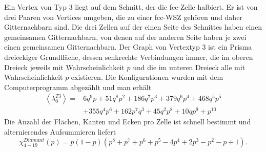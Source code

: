 Ein Vertex von Typ 3 liegt auf dem Schnitt, der die fcc-Zelle halbiert. Er ist von drei Paaren von Vertices umgeben, die zu einer fcc-WSZ geh\"oren und daher Gitternachbarn sind. Die drei Zellen auf der einen Seite des Schnittes haben einen gemeinsamen Gitternachbarn, von denen auf der anderen Seite haben je zwei einen gemeinsamen Gitternachbarn. Der Graph von Vertextyp 3 ist ein Prisma dreieckiger Grundfl\"ache, dessen senkrechte Verbindungen immer, die im oberen Dreieck jeweils mit Wahrscheinlichkeit $p$ und die im unteren Dreieck alle mit Wahrscheinlichkeit $p$ existieren. Die Konfigurationen wurden mit dem Computerprogramm abgez\"ahlt und man erh\"alt 
\begin{equation}
\begin{split}
\left<\lambda_0^{T3}\right>= & 6q^9p+51q^8p^2+186q^7p^3+379q^6p^4+468q^5p^5 \\ & +355q^4p^6+162p^7q^3+45q^2p^8+10qp^9+p^{10}
\end{split}
\end{equation}
Die Anzahl der Fl\"achen, Kanten und Ecken pro Zelle ist schnell bestimmt und alternierendes Aufsummieren liefert
\begin{equation}
\chi_{4-19}^{Diamant}(p)=p(1-p)(p^8+p^7+p^6+p^5-4p^4+2p^3-p^2-p+1).
\end{equation}

